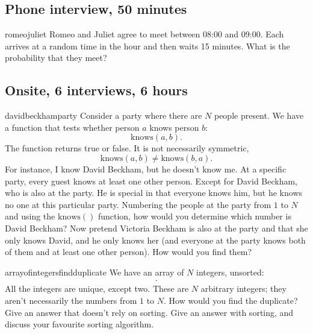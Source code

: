 \documentclass[a4paper]{article}
\begin{document}
\clearpage









\clearpage
\subsection{Phone interview,  50 minutes}
\begin{question}{romeojuliet}
Romeo and Juliet agree to meet between 08:00 and 09:00.
Each arrives at a random time in the hour and then waits 15 minutes.
What is the probability that they meet?
\end{question}

\clearpage



\clearpage
\subsection{Onsite, 6 interviews, 6 hours}
\begin{question}{davidbeckhamparty}
Consider a party where there are $N$ people present.
We have a function that tests whether person $a$ knows person $b$:
\[
  \text{knows}(a, b)
  \text{.}
\]
The function returns true or false.
It is not necessarily symmetric,
\[
  \text{knows}(a, b) \neq \text{knows}(b, a)
  \text{.}
\]
For instance, I know David Beckham, but he doesn't know me.
At a specific party, every guest knows at least one other person.
Except for David Beckham, who is also at the party.
He is special in that everyone knows him, but he knows no one at this particular party.
Numbering the people at the party from $1$ to $N$ and using the
$\text{knows}()$
function, how would you determine which number is David Beckham?
Now pretend Victoria Beckham is also at the party and that she only knows David, and he only knows her (and everyone at the party knows both of them and at least one other person).
How would you find them?

\end{question}



\begin{question}{arrayofintegersfindduplicate}
We have an array of $N$ integers, unsorted:
\begin{align*}
  [n_1, n_2, \ldots , n_{N} ]
  \text{.}
\end{align*}
All the integers are unique, except two.
These are $N$ arbitrary integers; they aren't necessarily the numbers from $1$ to $N$.
How would you find the duplicate?
Give an answer that doesn't rely on sorting.
Give an answer with sorting, and discuss your favourite sorting algorithm.
\end{question}
\end{document}
